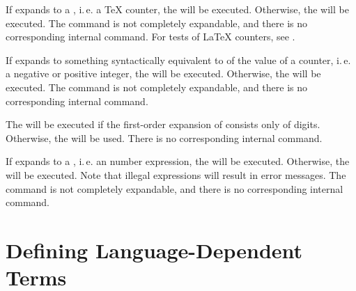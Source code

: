 \begin{Declaration}
\end{Declaration}
If  expands to a
, i.\,e. a \TeX{} counter, the  will be
executed. Otherwise, the  will be executed. The command is
not completely expandable, and there is no corresponding internal command. For
tests of \LaTeX{} counters, see .%
\EndIndexGroup


\begin{Declaration}
\end{Declaration}
If  expands to something
syntactically equivalent to of the value of a counter, i.\,e. a negative or
positive integer, the  will be executed. Otherwise, the
 will be executed. The command is not completely expandable,
and there is no corresponding internal command.%
\EndIndexGroup


\begin{Declaration}
\end{Declaration}
The  will be executed if the first-order expansion of
 consists only of digits. Otherwise, the  will
be used. There is no corresponding internal command.
%
\EndIndexGroup


\begin{Declaration}
\end{Declaration}
If  expands to a
, i.\,e. an \eTeX{} number expression, the 
will be executed. Otherwise, the  will be executed.
Note that illegal expressions will result in error
messages. The command is not completely expandable, and there is no
corresponding internal command.%
\EndIndexGroup


\section{Defining Language-Dependent Terms}
\BeginIndexGroup
{}

